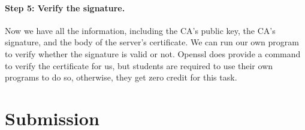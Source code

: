 \paragraph{Step 5: Verify the signature.} 
Now we have all the information, including the CA's public key, the CA's signature, and the
body of the server's certificate. We can run our own program to verify whether the 
signature is valid or not. Openssl does provide a command to verify the certificate for
us, but students are required to use their own programs to do so, otherwise, they get zero
credit for this task. 


\section{Submission}

\seedsubmission



